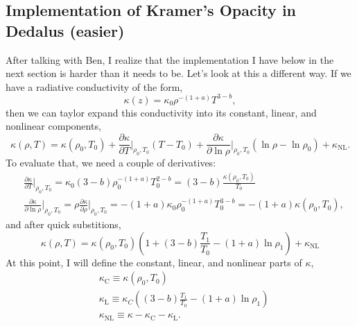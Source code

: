 \subsection{Implementation of Kramer's Opacity in Dedalus (easier)}
After talking with Ben, I realize that the implementation I have below in
the next section is harder than it needs to be. Let's look at this a different way.
If we have a radiative conductivity of the form,
\begin{equation}
\kappa(z) = \kappa_0 \rho^{-(1 + a)} T^{3 - b},
\end{equation}
then we can taylor expand this conductivity into its constant, linear, and
nonlinear components,
\begin{equation}
\kappa(\rho, T) = \kappa(\rho_0, T_0) 
+ \frac{\partial \kappa}{\partial T}\bigg|_{\rho_0, T_0}(T - T_0)
+ \frac{\partial \kappa}{\partial \ln\rho}\bigg|_{\rho_0, T_0}(\ln\rho - \ln\rho_0)
+ \kappa_{\text{NL}}.
\end{equation}
To evaluate that, we need a couple of derivatives:
\begin{equation}
\begin{split}
&\frac{\partial \kappa}{\partial T}\bigg|_{\rho_0, T_0} = 
\kappa_0(3-b)\rho_0^{-(1+a)}T_0^{2-b} = (3-b)\frac{\kappa(\rho_0, T_0)}{T_0} \\
&\frac{\partial \kappa}{\partial \ln\rho}\bigg|_{\rho_0, T_0} =
\rho\frac{\partial \kappa}{\partial \rho}\bigg|_{\rho_0, T_0} =
-(1+a)\kappa_0 \rho_0^{-(1+a)} T_0^{3-b} = -(1+a)\kappa(\rho_0, T_0),
\end{split}
\end{equation}
and after quick substitions,
\begin{equation}
\kappa(\rho, T) = \kappa(\rho_0, T_0)\left( 1 +
(3 - b)\frac{T_1}{T_0} - (1 + a) \ln\rho_1 \right)
+ \kappa_{\text{NL}}
\end{equation}
At this point, I will define the constant, linear, and nonlinear parts of $\kappa$,
\begin{equation}
\begin{split}
&\kappa_\text{C} \equiv \kappa(\rho_0, T_0) \\
&\kappa_\text{L} \equiv \kappa_C\left(
(3 - b)\frac{T_1}{T_0} - (1 + a) \ln\rho_1 \right) \\
&\kappa_{\text{NL}} \equiv \kappa - \kappa_\text{C} - \kappa_{\text{L}}.
\end{split}
\end{equation}

